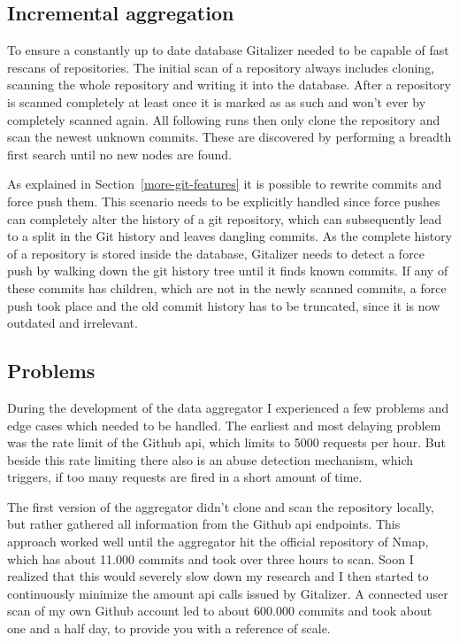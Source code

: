 \subsection{Incremental aggregation}
To ensure a constantly up to date database Gitalizer needed to be capable of fast rescans of repositories.
The initial scan of a repository always includes cloning, scanning the whole repository and writing it into the database.
After a repository is scanned completely at least once it is marked as as such and won't ever by completely scanned again.
All following runs then only clone the repository and scan the newest unknown commits.
These are discovered by performing a breadth first search until no new nodes are found.

As explained in Section~\ref{more-git-features} it is possible to rewrite commits and force push them.
This scenario needs to be explicitly handled since force pushes can completely alter the history of a git repository, which can subsequently lead to a split in the Git history and leaves dangling commits.
As the complete history of a repository is stored inside the database, Gitalizer needs to detect a force push by walking down the git history tree until it finds known commits.
If any of these commits has children, which are not in the newly scanned commits, a force push took place and the old commit history has to be truncated, since it is now outdated and irrelevant.


\subsection{Problems}
During the development of the data aggregator I experienced a few problems and edge cases which needed to be handled.
The earliest and most delaying problem was the rate limit of the Github \ac{api}, which limits to 5000 requests per hour.
But beside this rate limiting there also is an abuse detection mechanism, which triggers, if too many requests are fired in a short amount of time.

The first version of the aggregator didn't clone and scan the repository locally, but rather gathered all information from the Github \ac{api} endpoints.
This approach worked well until the aggregator hit the official repository of Nmap, which has about 11.000 commits and took over three hours to scan.
Soon I realized that this would severely slow down my research and I then started to continuously minimize the amount \ac{api} calls issued by Gitalizer.
A connected user scan of my own Github account led to about 600.000 commits and took about one and a half day, to provide you with a reference of scale.


